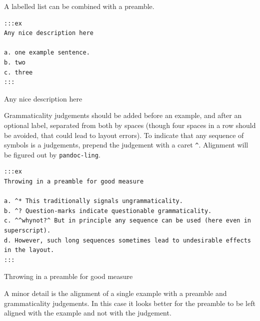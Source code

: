 \documentclass[
]{article}
\begin{document}
A labelled list can be combined with a preamble.

\begin{verbatim}
:::ex
Any nice description here

a. one example sentence.
b. two
c. three
:::
\end{verbatim}

\begin{samepage}
\begin{exe} \judgewidth{}
  \ex Any nice description here
  \begin{xlist}
  \end{xlist}
  \label{ex:4.5}
\end{exe}
\end{samepage}

Grammaticality judgements should be added before an example, and after
an optional label, separated from both by spaces (though four spaces in
a row should be avoided, that could lead to layout errors). To indicate
that any sequence of symbols is a judgements, prepend the judgement with
a caret \texttt{\^{}}. Alignment will be figured out by
\texttt{pandoc-ling}.

\begin{verbatim}
:::ex
Throwing in a preamble for good measure

a. ^* This traditionally signals ungrammaticality.
b. ^? Question-marks indicate questionable grammaticality.
c. ^^whynot?^ But in principle any sequence can be used (here even in superscript).
d. However, such long sequences sometimes lead to undesirable effects in the layout.
:::
\end{verbatim}

\begin{samepage}
\begin{exe} 
  \ex Throwing in a preamble for good measure
  \begin{xlist}
  \end{xlist}
  \label{ex:4.6}
\end{exe}
\end{samepage}

A minor detail is the alignment of a single example with a preamble and
grammaticality judgements. In this case it looks better for the preamble
to be left aligned with the example and not with the judgement.
\end{document}
